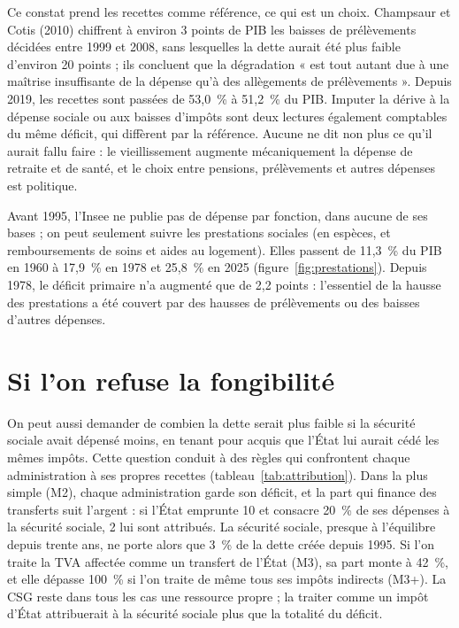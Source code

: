 \documentclass[11pt,a4paper]{article}
\begin{document}
Ce constat prend les recettes comme référence, ce qui est un choix. Champsaur et Cotis (2010)
chiffrent à environ 3 points de PIB les baisses de prélèvements décidées entre 1999 et 2008, sans
lesquelles la dette aurait été plus faible d'environ 20 points ; ils concluent que la dégradation
« est tout autant due à une maîtrise insuffisante de la dépense qu'à des allègements de
prélèvements ». Depuis 2019, les recettes sont passées de 53,0~\% à 51,2~\% du PIB. Imputer la dérive
à la dépense sociale ou aux baisses d'impôts sont deux lectures également comptables du même
déficit, qui diffèrent par la référence. Aucune ne dit non plus ce qu'il aurait fallu faire : le
vieillissement augmente mécaniquement la dépense de retraite et de santé, et le choix entre pensions,
prélèvements et autres dépenses est politique.

Avant 1995, l'Insee ne publie pas de dépense par fonction, dans aucune de ses bases ; on peut
seulement suivre les prestations sociales (en espèces, et remboursements de soins et aides au
logement). Elles passent de 11,3~\% du PIB en 1960 à 17,9~\% en 1978 et 25,8~\% en 2025
(figure~\ref{fig:prestations}). Depuis 1978, le déficit primaire n'a augmenté que de 2,2 points :
l'essentiel de la hausse des prestations a été couvert par des hausses de prélèvements ou des
baisses d'autres dépenses.


\section{Si l'on refuse la fongibilité}\label{sec:variantes}

On peut aussi demander de combien la dette serait plus faible si la sécurité sociale avait dépensé
moins, en tenant pour acquis que l'État lui aurait cédé les mêmes impôts. Cette question conduit à
des règles qui confrontent chaque administration à ses propres recettes
(tableau~\ref{tab:attribution}). Dans la plus simple (M2), chaque administration garde son déficit,
et la part qui finance des transferts suit l'argent : si l'État emprunte 10 et consacre 20~\% de ses
dépenses à la sécurité sociale, 2 lui sont attribués. La sécurité sociale, presque à l'équilibre
depuis trente ans, ne porte alors que 3~\% de la dette créée depuis 1995. Si l'on traite la TVA
affectée comme un transfert de l'État (M3), sa part monte à 42~\%, et elle dépasse 100~\% si l'on
traite de même tous ses impôts indirects (M3+). La CSG reste dans tous les cas une ressource
propre ; la traiter comme un impôt d'État attribuerait à la sécurité sociale plus que la totalité
du déficit.
\end{document}
